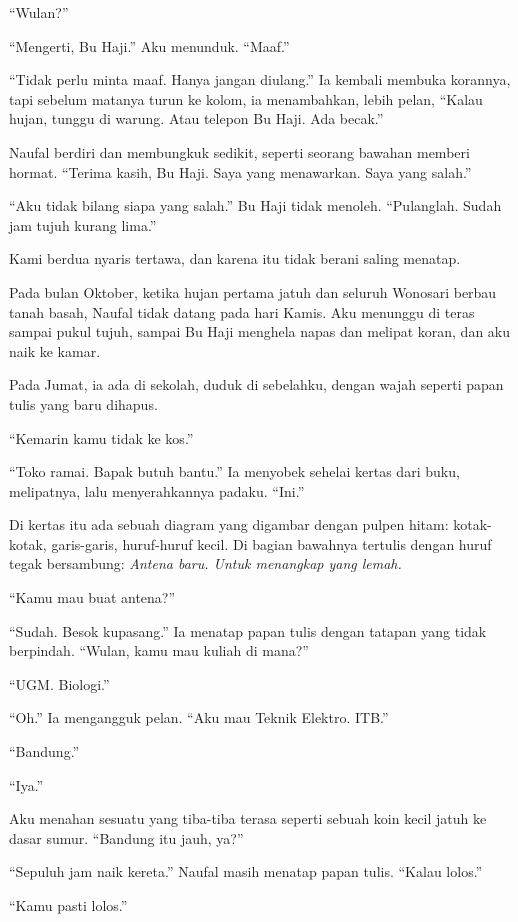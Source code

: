 \documentclass[11pt,twoside,openany]{book}
\makeatletter
\newcommand{\scenebreak}{\par\vspace{0.9em}{\centering\textsc{*\hspace{0.7em}*\hspace{0.7em}*}\par}\vspace{0.9em}\@afterindentfalse\@afterheading}
\makeatother
\begin{document}
``Wulan?''

``Mengerti, Bu Haji.'' Aku menunduk. ``Maaf.''

``Tidak perlu minta maaf. Hanya jangan diulang.'' Ia kembali membuka korannya, tapi sebelum matanya turun ke kolom, ia menambahkan, lebih pelan, ``Kalau hujan, tunggu di warung. Atau telepon Bu Haji. Ada becak.''

Naufal berdiri dan membungkuk sedikit, seperti seorang bawahan memberi hormat. ``Terima kasih, Bu Haji. Saya yang menawarkan. Saya yang salah.''

``Aku tidak bilang siapa yang salah.'' Bu Haji tidak menoleh. ``Pulanglah. Sudah jam tujuh kurang lima.''

Kami berdua nyaris tertawa, dan karena itu tidak berani saling menatap.

\scenebreak
Pada bulan Oktober, ketika hujan pertama jatuh dan seluruh Wonosari berbau tanah basah, Naufal tidak datang pada hari Kamis. Aku menunggu di teras sampai pukul tujuh, sampai Bu Haji menghela napas dan melipat koran, dan aku naik ke kamar.

Pada Jumat, ia ada di sekolah, duduk di sebelahku, dengan wajah seperti papan tulis yang baru dihapus.

``Kemarin kamu tidak ke kos.''

``Toko ramai. Bapak butuh bantu.'' Ia menyobek sehelai kertas dari buku, melipatnya, lalu menyerahkannya padaku. ``Ini.''

Di kertas itu ada sebuah diagram yang digambar dengan pulpen hitam: kotak-kotak, garis-garis, huruf-huruf kecil. Di bagian bawahnya tertulis dengan huruf tegak bersambung: \emph{Antena baru. Untuk menangkap yang lemah.}

``Kamu mau buat antena?''

``Sudah. Besok kupasang.'' Ia menatap papan tulis dengan tatapan yang tidak berpindah. ``Wulan, kamu mau kuliah di mana?''

``UGM. Biologi.''

``Oh.'' Ia mengangguk pelan. ``Aku mau Teknik Elektro. ITB.''

``Bandung.''

``Iya.''

Aku menahan sesuatu yang tiba-tiba terasa seperti sebuah koin kecil jatuh ke dasar sumur. ``Bandung itu jauh, ya?''

``Sepuluh jam naik kereta.'' Naufal masih menatap papan tulis. ``Kalau lolos.''

``Kamu pasti lolos.''
\end{document}
